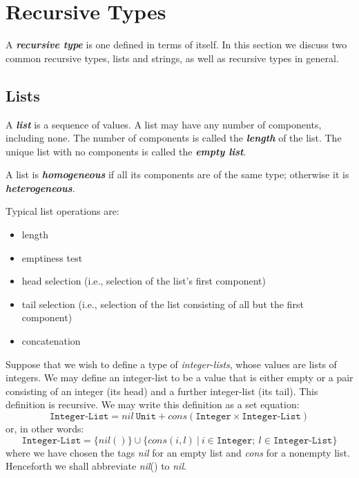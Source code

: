 \documentclass{article}
\begin{document}
\section{Recursive Types}

A \textbf{\textit{recursive type}} is one defined in terms of itself. In this section we discuss two common recursive types, lists and strings, as well as recursive types in general.

\subsection{Lists}

A \textbf{\textit{list}} is a sequence of values. A list may have any number of components, including none. The number of components is called the \textbf{\textit{length}} of the list. The unique list with no components is called the \textbf{\textit{empty list}}.

A list is \textbf{\textit{homogeneous}} if all its components are of the same type; otherwise it is \textbf{\textit{heterogeneous}}. 

Typical list operations are:
\begin{itemize}
    \item length
    \item emptiness test
    \item head selection (i.e., selection of the list’s first component)
    \item tail selection (i.e., selection of the list consisting of all but the first component)
    \item concatenation
\end{itemize}

Suppose that we wish to define a type of \textit{integer-lists}, whose values are lists of integers. We may define an integer-list to be a value that is either empty or a pair consisting of an integer (its head) and a further integer-list (its tail). This definition is recursive. We may write this definition as a set equation:
\begin{equation}
    \texttt{Integer-List} = nil\ \texttt{Unit} + cons(\texttt{Integer} × \texttt{Integer-List})
\end{equation}
or, in other words:
\begin{equation}
    \texttt{Integer-List} = \{nil()\} \cup \{cons(i, l)\ |\ i \in \texttt{Integer};\ l \in \texttt{Integer-List}\}
\end{equation}
where we have chosen the tags \textit{nil} for an empty list and \textit{cons} for a nonempty list. Henceforth we shall abbreviate \textit{nil}() to \textit{nil}.
\end{document}
